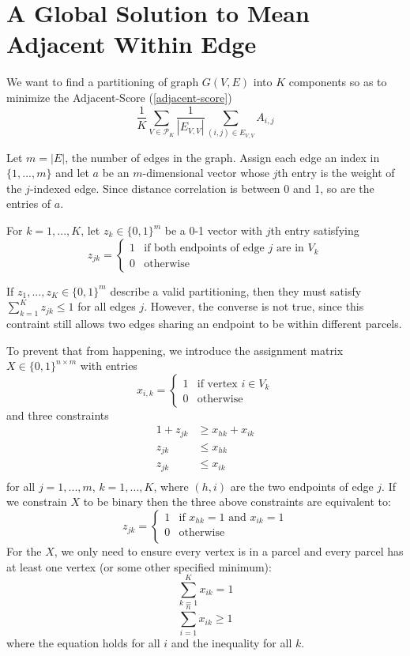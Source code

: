 \section{A Global Solution to Mean Adjacent Within Edge}

We want to find a partitioning of graph $G(V,E)$ into $K$ components
so as to minimize the Adjacent-Score (\ref{adjacent-score})
\[ \frac{1}{K} \sum_{V \in \mathcal{P}_K}
   \frac{1}{|E_{V,V}|} \sum_{(i,j) \in E_{V,V}} A_{i,j}
\]

Let $m = |E|$, the number of edges in the graph. Assign each edge an
index in $\{1, ..., m\}$ and 
let $a$ be an $m$-dimensional vector whose $j$th entry is the weight of
the $j$-indexed edge. Since distance correlation is between 0 and 1, so
are the entries of $a$.

For $k = 1, ..., K$, let $z_k \in \{0, 1\}^m$ be a 0-1 vector with
$j$th entry satisfying
\[ z_{jk} = \begin{cases}
  1 & \text{if both endpoints of edge } j \text{ are in } V_k \\
  0 & \text{otherwise}
\end{cases} \]

If $z_1, ..., z_K \in \{0, 1\}^m$ describe a valid partitioning, then
they must satisfy $\sum_{k=1}^K z_{jk} \leq 1$ for all edges $j$.
However, the converse is not true, since this contraint still allows two
edges sharing an endpoint to be within different parcels.

To prevent that from happening, we introduce the assignment matrix
$X \in \{0, 1\}^{n \times m}$ with entries
\[ x_{i,k} = \begin{cases}
  1 & \text{if vertex } i \in V_k \\
  0 & \text{otherwise}
\end{cases} \]
and three constraints
\begin{align*}
1 + z_{jk} &\geq x_{hk} + x_{ik} \\
z_{jk} &\leq x_{hk} \\
z_{jk} &\leq x_{ik} \\
\end{align*}
for all $j = 1, ..., m$, $k = 1, ..., K$, where $(h,i)$ are the two
endpoints of edge $j$. If we constrain $X$ to be binary then the three
above constraints are equivalent to:
\[ z_{jk} = \begin{cases}
  1 & \text{if } x_{hk} = 1 \text{ and } x_{ik} = 1 \\
  0 & \text{otherwise} \\
\end{cases}\]
For the $X$, we only need to ensure every vertex is in a parcel and every
parcel has at least one vertex (or some other specified minimum):
\[ \sum_{k=1}^K x_{ik} = 1 \]
\[ \sum_{i=1}^n x_{ik} \geq 1 \]
where the equation holds for all $i$ and the inequality for all $k$.

